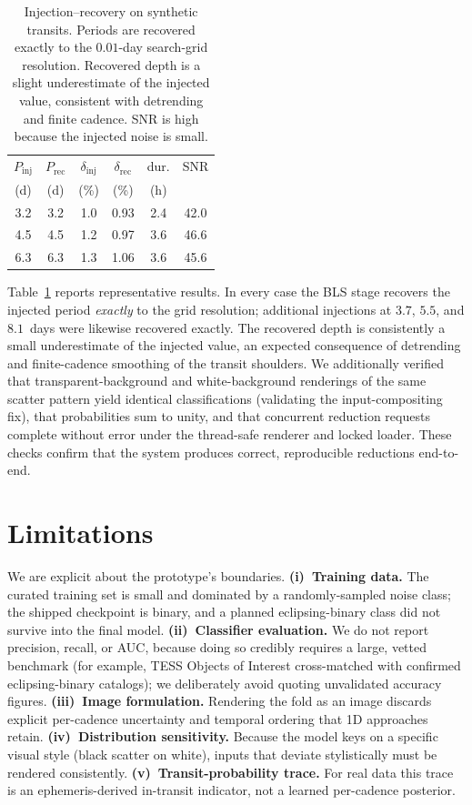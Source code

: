 \documentclass[twocolumn,10pt]{article}
\begin{document}
\begin{table}[t]
\centering
\caption{Injection--recovery on synthetic transits. Periods are recovered exactly
to the $0.01$-day search-grid resolution. Recovered depth is a slight
underestimate of the injected value, consistent with detrending and finite
cadence. SNR is high because the injected noise is small.}
\label{tab:inj}
\small
\begin{tabular}{@{}cccccc@{}}
\toprule
$P_{\mathrm{inj}}$ & $P_{\mathrm{rec}}$ & $\delta_{\mathrm{inj}}$ &
$\delta_{\mathrm{rec}}$ & dur. & SNR \\
(d) & (d) & (\%) & (\%) & (h) & \\
\midrule
3.2 & 3.2 & 1.0 & 0.93 & 2.4 & 42.0 \\
4.5 & 4.5 & 1.2 & 0.97 & 3.6 & 46.6 \\
6.3 & 6.3 & 1.3 & 1.06 & 3.6 & 45.6 \\
\bottomrule
\end{tabular}
\end{table}

Table~\ref{tab:inj} reports representative results. In every case the BLS stage
recovers the injected period \emph{exactly} to the grid resolution; additional
injections at $3.7$, $5.5$, and $8.1$~days were likewise recovered exactly. The
recovered depth is consistently a small underestimate of the injected value, an
expected consequence of detrending and finite-cadence smoothing of the transit
shoulders. We additionally verified that transparent-background and
white-background renderings of the same scatter pattern yield identical
classifications (validating the input-compositing fix), that probabilities sum to
unity, and that concurrent reduction requests complete without error under the
thread-safe renderer and locked loader. These checks confirm that the system
produces correct, reproducible reductions end-to-end.

\section{Limitations}
We are explicit about the prototype's boundaries. \textbf{(i)~Training data.} The
curated training set is small and dominated by a randomly-sampled noise class; the
shipped checkpoint is binary, and a planned eclipsing-binary class did not survive
into the final model. \textbf{(ii)~Classifier evaluation.} We do not report
precision, recall, or AUC, because doing so credibly requires a large, vetted
benchmark (for example, TESS Objects of Interest cross-matched with confirmed
eclipsing-binary catalogs); we deliberately avoid quoting unvalidated accuracy
figures. \textbf{(iii)~Image formulation.} Rendering the fold as an image discards
explicit per-cadence uncertainty and temporal ordering that 1D approaches retain.
\textbf{(iv)~Distribution sensitivity.} Because the model keys on a specific visual
style (black scatter on white), inputs that deviate stylistically must be rendered
consistently. \textbf{(v)~Transit-probability trace.} For real data this trace is
an ephemeris-derived in-transit indicator, not a learned per-cadence posterior.
\end{document}
